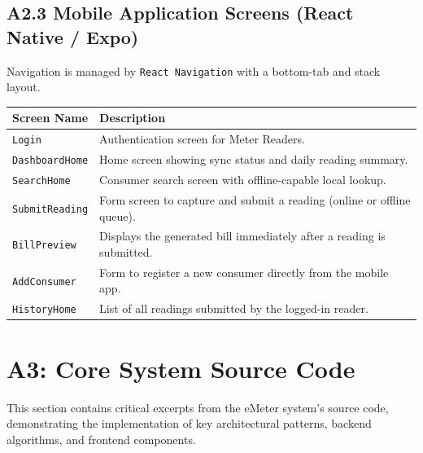 \documentclass[12pt, a4paper, onecolumn]{report}
\begin{document}
\vspace{0.8em}
\subsection*{A2.3 Mobile Application Screens (React Native / Expo)}
Navigation is managed by \texttt{React Navigation} with a bottom-tab and stack layout.

\begin{tabularx}{\textwidth}{|p{4.5cm}|X|}
\hline
\textbf{Screen Name} & \textbf{Description} \\
\hline
\texttt{Login} & Authentication screen for Meter Readers. \\
\hline
\texttt{DashboardHome} & Home screen showing sync status and daily reading summary. \\
\hline
\texttt{SearchHome} & Consumer search screen with offline-capable local lookup. \\
\hline
\texttt{SubmitReading} & Form screen to capture and submit a reading (online or offline queue). \\
\hline
\texttt{BillPreview} & Displays the generated bill immediately after a reading is submitted. \\
\hline
\texttt{AddConsumer} & Form to register a new consumer directly from the mobile app. \\
\hline
\texttt{HistoryHome} & List of all readings submitted by the logged-in reader. \\
\hline
\end{tabularx}

\vspace{1.5em}
\newpage
\section*{A3: Core System Source Code}
This section contains critical excerpts from the eMeter system's source code, demonstrating the implementation of key architectural patterns, backend algorithms, and frontend components.
\end{document}

